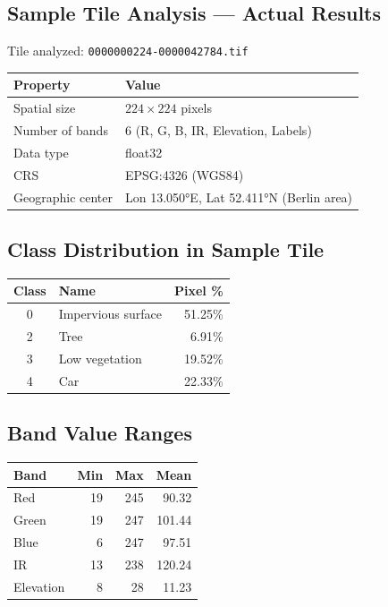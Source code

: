 \documentclass[12pt,a4paper]{article}
\begin{document}
\subsection{Sample Tile Analysis --- Actual Results}

Tile analyzed: \texttt{0000000224-0000042784.tif}

\begin{center}
\begin{tabular}{l l}
\toprule
\textbf{Property} & \textbf{Value} \\
\midrule
Spatial size   & $224 \times 224$ pixels \\
Number of bands & 6 (R, G, B, IR, Elevation, Labels) \\
Data type      & float32 \\
CRS            & EPSG:4326 (WGS84) \\
Geographic center & Lon 13.050°E, Lat 52.411°N (Berlin area) \\
\bottomrule
\end{tabular}
\end{center}

\subsection{Class Distribution in Sample Tile}

\begin{center}
\begin{tabular}{c l r}
\toprule
\textbf{Class} & \textbf{Name} & \textbf{Pixel \%} \\
\midrule
0 & Impervious surface & 51.25\% \\
2 & Tree               &  6.91\% \\
3 & Low vegetation     & 19.52\% \\
4 & Car                & 22.33\% \\
\bottomrule
\end{tabular}
\end{center}

\subsection{Band Value Ranges}

\begin{center}
\begin{tabular}{l r r r}
\toprule
\textbf{Band} & \textbf{Min} & \textbf{Max} & \textbf{Mean} \\
\midrule
Red       & 19  & 245 & 90.32  \\
Green     & 19  & 247 & 101.44 \\
Blue      &  6  & 247 & 97.51  \\
IR        & 13  & 238 & 120.24 \\
Elevation &  8  &  28 & 11.23  \\
\bottomrule
\end{tabular}
\end{center}
\end{document}
